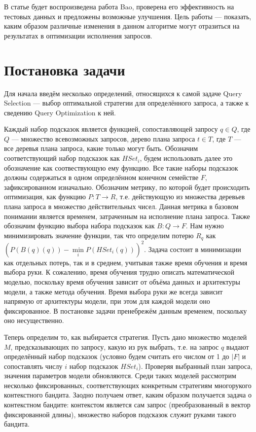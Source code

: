 \documentclass[12pt]{article}
\begin{document}
В статье будет воспроизведена работа Bao, проверена его эффективность на тестовых данных и предложены возможные улучшения. Цель работы — показать, каким образом различные изменения в данном алгоритме могут отразиться на результатах в оптимизации исполнения запросов.

\section{Постановка задачи}

Для начала введём несколько определений, относящихся к самой задаче Query Selection — выбор оптимальной стратегии для определённого запроса, а также к сведению Query Optimization к ней.

Каждый набор подсказок является функцией, сопоставляющей запросу $q \in Q$, где $Q$ — множество всевозможных запросов, дерево плана запроса $t \in T$, где $T$ — все деревья плана запроса, какие только могут быть. Обозначим соответствующий набор подсказок как $HSet_i$, будем использовать далее это обозначение как соотвествующую ему функцию. Все такие наборы подсказок должны содержаться в одном определённом конечном семействе $F$, зафиксированном изначально. Обозначим метрику, по которой будет происходить оптимизация, как функцию $P : T \xrightarrow{} R$, т.е. действующую из множества деревьев плана запроса в множество действительных чисел. Данная метрика в базовом понимании является временем, затраченным на исполнение плана запроса. Также обозначим функцию выбора набора подсказок как $B: Q \xrightarrow{} F$. Нам нужно минимизировать значение функции, так что определим потерю $R_q$ как $(P(B(q)(q)) - \min\limits_{i} P(HSet_i(q)))^2$. Задача состоит в минимизации как отдельных потерь, так и в среднем, учитывая также время обучения и время выбора руки. К сожалению, время обучения трудно описать математической моделью, поскольку время обучения зависит от объёма данных и архитектуры модели, а также метода обучения. Время выбора руки же всегда зависит напрямую от архитектуры модели, при этом для каждой модели оно фиксированное. В постановке задачи пренебрежём данным временем, поскольку оно несущественно.

Теперь определим то, как выбирается стратегия. Пусть дано множество моделей $M$, предсказывающих по запросу, какую из рук выбрать, т.е. на запрос $q$ выдают определённый набор подсказок (условно будем считать его числом от 1 до $|F|$ и сопоставлять числу $i$ набор подсказок $HSet_i$). Проверяя выбранный план запроса, значения параметров модели обновляются. Среди таких моделей рассмотрим несколько фиксированных, соответствующих конкретным стратегиям многорукого контекстного бандита. Заодно получаем ответ, каким образом получается задача о контекстном бандите: контекстом является сам запрос (преобразованный в вектор фиксированной длины), множество наборов подсказок служит руками такого бандита.
\end{document}
